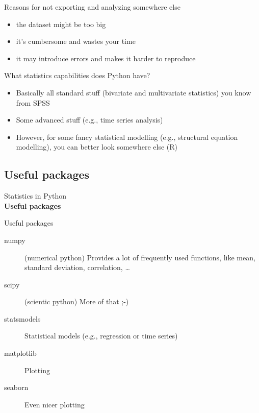 \documentclass[handout]{beamer}
\begin{document}
\begin{frame}{Reasons for not exporting and analyzing somewhere else}
\begin{itemize}
	\item the dataset might be too big
	\item it's cumbersome and wastes your time
	\item it may introduce errors and makes it harder to reproduce
\end{itemize}
\end{frame}


\begin{frame}{What statistics capabilities does Python have?}
	
\begin{itemize}
	\item Basically all standard stuff (bivariate and multivariate statistics) you know from SPSS
	\item Some advanced stuff (e.g., time series analysis)
	\item However, for some fancy statistical modelling (e.g., structural equation modelling), you can better look somewhere else (R)
	
\end{itemize}
\end{frame}





\subsection{Useful packages}

\begin{frame}[plain]
	Statistics in Python\\
	\textbf{Useful packages}
\end{frame}


\begin{frame}{Useful packages}
	\begin{description}
		\item[numpy] (numerical python) Provides a lot of frequently used functions, like mean, standard deviation, correlation, \ldots
		\item[scipy] (scientic python) More of that ;-)
		\item[statsmodels] Statistical models (e.g., regression or time series)
		\item[matplotlib] Plotting
		\item[seaborn] Even nicer plotting
		
	\end{description}
\end{frame}
\end{document}

